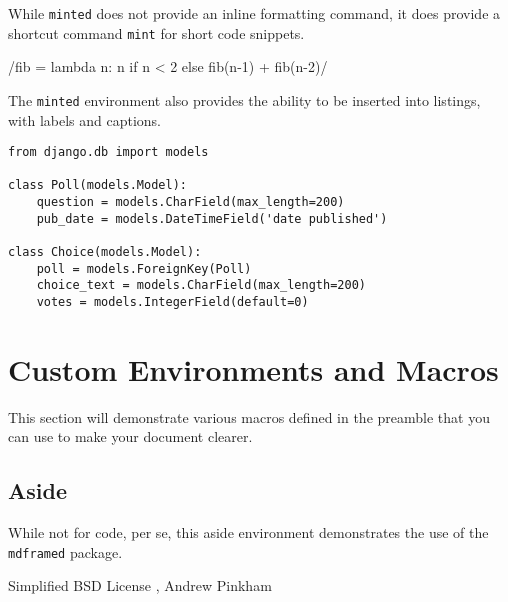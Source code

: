 While \verb|minted| does not provide an inline formatting command, it does provide a shortcut command \verb|mint| for short code snippets.

/fib = lambda n: n if n < 2 else fib(n-1) + fib(n-2)/

The \verb|minted| environment also provides the ability to be inserted into listings, with labels and captions.

\begin{listing}[H]
\begin{verbatim}
from django.db import models

class Poll(models.Model):
    question = models.CharField(max_length=200)
    pub_date = models.DateTimeField('date published')

class Choice(models.Model):
    poll = models.ForeignKey(Poll)
    choice_text = models.CharField(max_length=200)
    votes = models.IntegerField(default=0)
\end{verbatim}
\cprotect\caption{\verb|models.py| from Django Tutorial using Minted}
\label{code:django:models_basic_minted}
\end{listing}

\section[Macros]{Custom Environments and Macros}

This section will demonstrate various macros defined in the preamble that you can use to make your document clearer.

\subsection{Aside}

While not for code, per se, this aside environment demonstrates the use of the \verb|mdframed| package.

\begin{aside}
\lipsum[1] %
\end{aside}

\begin{center}
Simplified BSD License , Andrew Pinkham
 \end{center}


